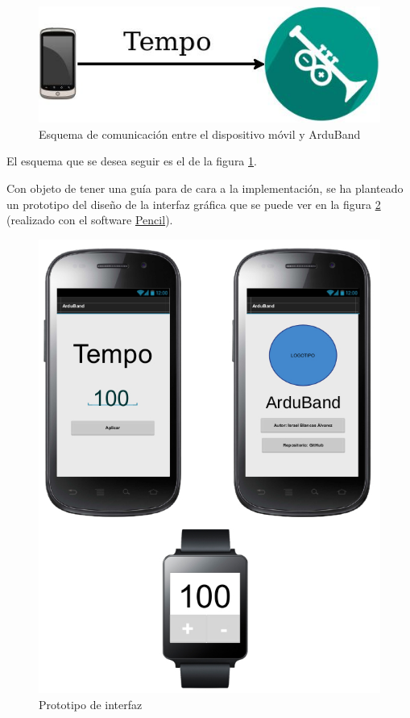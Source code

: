 \begin{figure}[htb]
\centering
\includegraphics[width=1\textwidth]{./imagenes/movilarduband}
\caption{Esquema de comunicación entre el dispositivo móvil y ArduBand} \label{fig:movilarduband}
\end{figure}

El esquema que se desea seguir es el de la figura \ref{fig:movilarduband}.

Con objeto de tener una guía para de cara a la implementación, se ha planteado un
prototipo del diseño de la interfaz gráfica que se puede ver en la figura
\ref{fig:prototipointerfaz} (realizado con el software \href{http://pencil.evolus.vn/}{Pencil}).\\

\begin{figure}[htb]
\centering
\includegraphics[width=1\textwidth]{./imagenes/prototipointerfaz}
\caption{Prototipo de interfaz} \label{fig:prototipointerfaz}
\end{figure}


